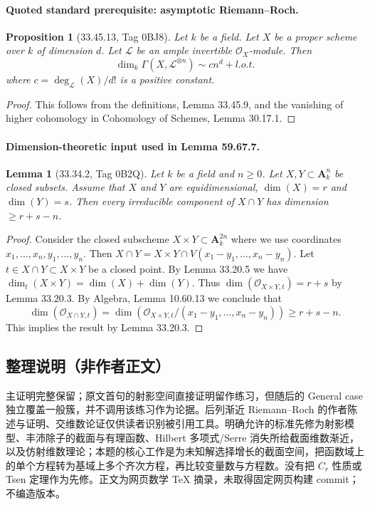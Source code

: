 \documentclass[UTF8,11pt]{ctexart}
\newtheorem*{lemma}{Lemma}
\newtheorem*{proposition}{Proposition}
\theoremstyle{definition}
\begin{document}
\paragraph{Quoted standard prerequisite: asymptotic Riemann--Roch.}
\begin{proposition}[33.45.13, Tag 0BJ8]
Let $k$ be a field. Let $X$ be a proper scheme over $k$ of dimension $d$. Let $\mathcal L$ be an ample invertible $\mathcal O_X$-module. Then
\[\dim_k\Gamma(X,\mathcal L^{\otimes n})\sim cn^d+l.o.t.\]
where $c=\deg_{\mathcal L}(X)/d!$ is a positive constant.
\end{proposition}
\begin{proof}
This follows from the definitions, Lemma 33.45.9, and the vanishing of higher cohomology in Cohomology of Schemes, Lemma 30.17.1.
\end{proof}
\paragraph{Dimension-theoretic input used in Lemma 59.67.7.}
\begin{lemma}[33.34.2, Tag 0B2Q]
Let $k$ be a field and $n\geq0$. Let $X,Y\subset\mathbf A^n_k$ be closed subsets. Assume that $X$ and $Y$ are equidimensional, $\dim(X)=r$ and $\dim(Y)=s$. Then every irreducible component of $X\cap Y$ has dimension $\geq r+s-n$.
\end{lemma}
\begin{proof}
Consider the closed subscheme $X\times Y\subset\mathbf A^{2n}_k$ where we use coordinates $x_1,\ldots,x_n,y_1,\ldots,y_n$. Then $X\cap Y=X\times Y\cap V(x_1-y_1,\ldots,x_n-y_n)$. Let $t\in X\cap Y\subset X\times Y$ be a closed point. By Lemma 33.20.5 we have $\dim_t(X\times Y)=\dim(X)+\dim(Y)$. Thus $\dim(\mathcal O_{X\times Y,t})=r+s$ by Lemma 33.20.3. By Algebra, Lemma 10.60.13 we conclude that
\[\dim(\mathcal O_{X\cap Y,t})=\dim(\mathcal O_{X\times Y,t}/(x_1-y_1,\ldots,x_n-y_n))\geq r+s-n.\]
This implies the result by Lemma 33.20.3.
\end{proof}
\subsection*{整理说明（非作者正文）}
主证明完整保留；原文首句的射影空间直接证明留作练习，但随后的 General case 独立覆盖一般簇，并不调用该练习作为论据。后列渐近 Riemann--Roch 的作者陈述与证明、交维数论证仅供读者识别被引用工具。明确允许的标准先修为射影模型、丰沛除子的截面与有理函数、Hilbert 多项式/Serre 消失所给截面维数渐近，以及仿射维数理论；本题的核心工作是为未知解选择增长的截面空间，把函数域上的单个方程转为基域上多个齐次方程，再比较变量数与方程数。没有把 $C_r$ 性质或 Tsen 定理作为先修。正文为网页数学 TeX 摘录，未取得固定网页构建 commit；不编造版本。
\end{document}
